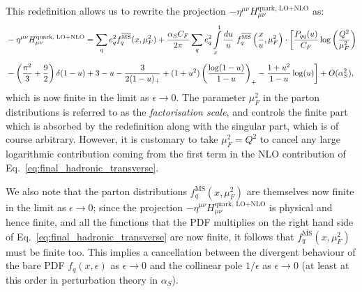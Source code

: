 \documentclass[withindex,glossary]{cam-thesis}
\begin{document}
This redefinition allows us to rewrite the projection $-\eta^{\mu\nu} H_{\mu\nu}^{\text{quark, LO+NLO}}$ as:
\begin{align}
&-\eta^{\mu\nu} H_{\mu\nu}^{\text{quark, LO+NLO}} = \sum_{q} e_q^2 f_{q}^{\overline{\text{MS}}}(x, \mu_F^2) + \frac{\alpha_S C_F }{2\pi} \sum_{q} e_q^2 \int\limits_{x}^{1} \frac{du}{u}\ f_q^{\overline{\text{MS}}}\left( \frac{x}{u},\mu_F^2 \right) \cdot \bigg[ \frac{P_{qq}(u)}{C_F} \log\left( \frac{Q^2}{\mu_F^2} \right)\notag\\[1.5ex]
\label{eq:final_hadronic_transverse}
&  - \left(  \frac{\pi^2}{3} + \frac{9}{2} \right) \delta(1-u) + 3 - u - \frac{3}{2(1-u)_+} + (1+u^2) \left( \frac{\log(1-u)}{1-u} \right)_+ - \frac{1+u^2}{1-u} \log(u) \bigg] + O(\alpha_S^2), 
\end{align}
\noindent which is now finite in the limit as $\epsilon \rightarrow 0$. The parameter $\mu_F^2$ in the parton distributions is referred to as the \textit{factorisation scale}, and controls the finite part which is absorbed by the redefinition along with the singular part, which is of course arbitrary. However, it is customary to take $\mu_F^2 = Q^2$ to cancel any large logarithmic contribution coming from the first term in the NLO contribution of Eq.~\eqref{eq:final_hadronic_transverse}.

We also note that the parton distributions $f_q^{\overline{\text{MS}}}(x,\mu_F^2)$ are themselves now finite in the limit as $\epsilon \rightarrow 0$; since the projection $-\eta^{\mu\nu} H_{\mu\nu}^{\text{quark, LO+NLO}}$ is physical and hence finite, and all the functions that the PDF multiplies on the right hand side of Eq.~\eqref{eq:final_hadronic_transverse} are now finite, it follows that $f_q^{\overline{\text{MS}}}(x,\mu_F^2)$ must be finite too. This implies a cancellation between the divergent behaviour of the bare PDF $f_q(x,\epsilon)$ as $\epsilon \rightarrow 0$ and the collinear pole $1/\epsilon$ as $\epsilon \rightarrow 0$ (at least at this order in perturbation theory in $\alpha_S$).
\end{document}
